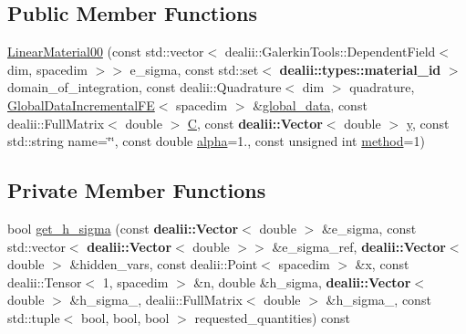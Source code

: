 \subsection*{Public Member Functions}
\begin{DoxyCompactItemize}
\item 
\hyperlink{classincremental_f_e_1_1_linear_material00_a10b391080fbf7b8198bbfb407abc5216}{Linear\+Material00} (const std\+::vector$<$ dealii\+::\+Galerkin\+Tools\+::\+Dependent\+Field$<$ dim, spacedim $>$$>$ e\+\_\+sigma, const std\+::set$<$ {\bf dealii\+::types\+::material\+\_\+id} $>$ domain\+\_\+of\+\_\+integration, const dealii\+::\+Quadrature$<$ dim $>$ quadrature, \hyperlink{classincremental_f_e_1_1_global_data_incremental_f_e}{Global\+Data\+Incremental\+FE}$<$ spacedim $>$ \&\hyperlink{classincremental_f_e_1_1_linear_material00_adc2fce8d6428b316b1b5a6245fc93629}{global\+\_\+data}, const dealii\+::\+Full\+Matrix$<$ double $>$ \hyperlink{classincremental_f_e_1_1_linear_material00_ab1be4c9977c7d6671c5893dbfeb21078}{C}, const {\bf dealii\+::\+Vector}$<$ double $>$ \hyperlink{classincremental_f_e_1_1_linear_material00_a4b080a85b2d860bfaadbd1480cb9a69b}{y}, const std\+::string name=\char`\"{}\char`\"{}, const double \hyperlink{classincremental_f_e_1_1_linear_material00_a81a2c21ea6ca1e039fc4991a2db64cfe}{alpha}=1., const unsigned int \hyperlink{classincremental_f_e_1_1_linear_material00_abc882081c652f94f40a24eb47da078fa}{method}=1)
\end{DoxyCompactItemize}
\subsection*{Private Member Functions}
\begin{DoxyCompactItemize}
\item 
bool \hyperlink{classincremental_f_e_1_1_linear_material00_ab317a4ab3ee26be5f5cf269367875ac8}{get\+\_\+h\+\_\+sigma} (const {\bf dealii\+::\+Vector}$<$ double $>$ \&e\+\_\+sigma, const std\+::vector$<$ {\bf dealii\+::\+Vector}$<$ double $>$$>$ \&e\+\_\+sigma\+\_\+ref, {\bf dealii\+::\+Vector}$<$ double $>$ \&hidden\+\_\+vars, const dealii\+::\+Point$<$ spacedim $>$ \&x, const dealii\+::\+Tensor$<$ 1, spacedim $>$ \&n, double \&h\+\_\+sigma, {\bf dealii\+::\+Vector}$<$ double $>$ \&h\+\_\+sigma\+\_, dealii\+::\+Full\+Matrix$<$ double $>$ \&h\+\_\+sigma\+\_, const std\+::tuple$<$ bool, bool, bool $>$ requested\+\_\+quantities) const 
\end{DoxyCompactItemize}

